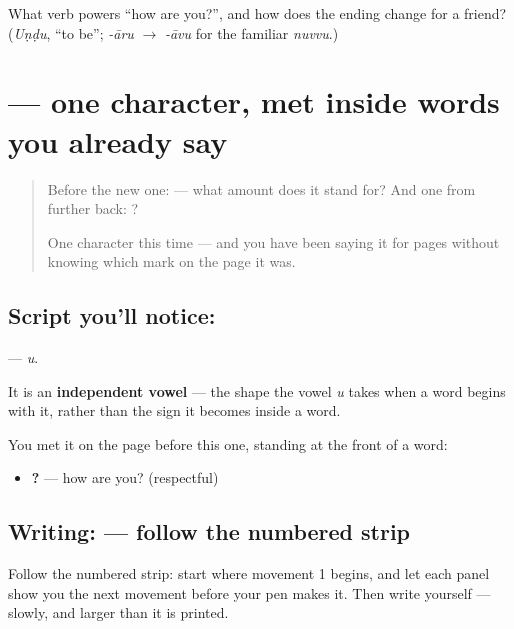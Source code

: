 \begin{tcolorbox}[breakable,colback=teal!4,colframe=teal!35!black,title={Before you move on}]
What verb powers \textquotedblleft{}how are you?\textquotedblright{}, and how does the ending change for a friend? (\emph{Uṇḍu}, \textquotedblleft{}to be\textquotedblright{}; \emph{-āru} $\to$ \emph{-āvu} for the familiar \emph{nuvvu}.)
\end{tcolorbox}
\section[\texorpdfstring{\te{ఉ} (u)}{ఉ (u)}]{ — one character, met inside words you already say}

\label{lesson:TE-S122-letter-u}



\begin{quote}
Before the new one:  — what amount does it stand for? And one from further back: ?

One character this time — and you have been saying it for pages without knowing which mark on the page it was.
\end{quote}

\subsection*{Script you'll notice: }
\textbf{} — \emph{u}.

It is an \textbf{independent vowel} — the shape the vowel \emph{u} takes when a word begins with it, rather than the sign it becomes inside a word.

You met it on the page before this one, standing at the front of a word:

\begin{itemize}
\raggedright
  \item \textbf{  ?} — how are you? (respectful)
\end{itemize}

\subsection*{Writing:  — follow the numbered strip}

Follow the numbered strip: start where movement 1 begins, and let each panel show you the next movement before your pen makes it. Then write  yourself — slowly, and larger than it is printed.

